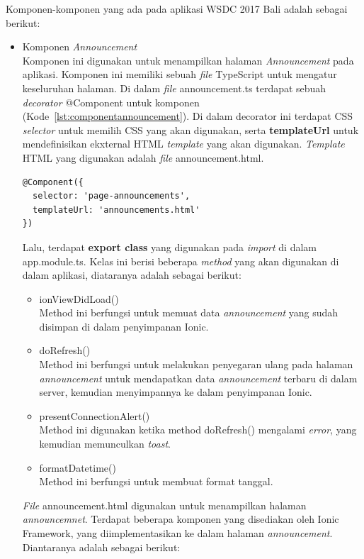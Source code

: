Komponen-komponen yang ada pada aplikasi WSDC 2017 Bali adalah sebagai berikut:

\begin{itemize}
	\item Komponen \textit{Announcement} \\
	Komponen ini digunakan untuk menampilkan halaman \textit{Announcement} pada aplikasi. Komponen ini memiliki sebuah \textit{file} TypeScript untuk mengatur keseluruhan halaman. Di dalam \textit{file} announcement.ts terdapat sebuah \textit{decorator} @Component untuk komponen (Kode~\ref{lst:componentannouncement}). Di dalam decorator ini terdapat CSS \textit{selector} untuk memilih CSS yang akan digunakan, serta \textbf{templateUrl} untuk mendefinisikan ekxternal HTML \textit{template} yang akan digunakan. \textit{Template} HTML yang digunakan adalah \textit{file} announcement.html. 
\begin{lstlisting}[language=html, label={lst:componentannouncement}, caption=@Component pada annoncement.ts]
@Component({
  selector: 'page-announcements',
  templateUrl: 'announcements.html'
})
\end{lstlisting} 
	Lalu, terdapat \textbf{export class} yang digunakan pada \textit{import} di dalam app.module.ts. Kelas ini berisi beberapa \textit{method} yang akan digunakan di dalam aplikasi, diataranya adalah sebagai berikut:
	\begin{itemize}
		\item ionViewDidLoad() \\
		Method ini berfungsi untuk memuat data \textit{announcement} yang sudah disimpan di dalam penyimpanan Ionic. 
		\item doRefresh() \\
		Method ini berfungsi untuk melakukan penyegaran ulang pada halaman \textit{announcement} untuk mendapatkan data \textit{announcement} terbaru di dalam server, kemudian menyimpannya ke dalam penyimpanan Ionic.
		\newpage
		\item presentConnectionAlert() \\
		Method ini digunakan ketika method doRefresh() mengalami \textit{error}, yang kemudian memunculkan \textit{toast}.
		\item formatDatetime() \\
		Method ini berfungsi untuk membuat format tanggal.
	\end{itemize}

	\textit{File} announcement.html digunakan untuk menampilkan halaman \textit{announcemnet}. Terdapat beberapa komponen yang disediakan oleh Ionic Framework, yang diimplementasikan ke dalam halaman \textit{announcement}. Diantaranya adalah sebagai berikut:	
	

\end{itemize}
